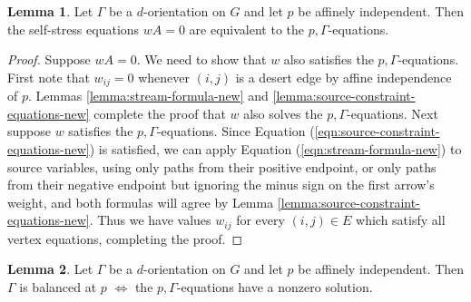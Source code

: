 \documentclass[11pt,letterpaper]{amsart}
\theoremstyle{definition}
\newtheorem{lemma}{Lemma}
\begin{document}
\begin{lemma}\label{lemma:stress-system-equivalent-Gamma-system}
    Let $\Gamma$ be a $d$-orientation on $G$ and let $p$ be affinely independent. Then the self-stress equations $wA = 0$ are equivalent to the $p,\Gamma$-equations.
\end{lemma}

\begin{proof}
    Suppose $wA = 0$. We need to show that $w$ also satisfies the $p,\Gamma$-equations. First note that $w_{ij} = 0$ whenever $(i,j)$ is a desert edge by affine independence of $p$. Lemmas \ref{lemma:stream-formula-new} and \ref{lemma:source-constraint-equations-new} complete the proof that $w$ also solves the $p,\Gamma$-equations.
    Next suppose $w$ satisfies the $p,\Gamma$-equations. Since Equation (\ref{eqn:source-constraint-equations-new}) is satisfied, we can apply Equation (\ref{eqn:stream-formula-new}) to source variables, using only paths from their positive endpoint, or only paths from their negative endpoint but ignoring the minus sign on the first arrow's weight, and both formulas will agree by Lemma \ref{lemma:source-constraint-equations-new}. Thus we have values $w_{ij}$ for every $(i,j) \in E$ which satisfy all vertex equations, completing the proof.
\end{proof}

\begin{lemma}\label{lemma:balanced-equivalent-nonzero-solution}
    Let $\Gamma$ be a $d$-orientation on $G$ and let $p$ be affinely independent. Then $\Gamma$ is balanced at $p$ $\iff$ the $p,\Gamma$-equations have a nonzero solution.
\end{lemma}
\end{document}
